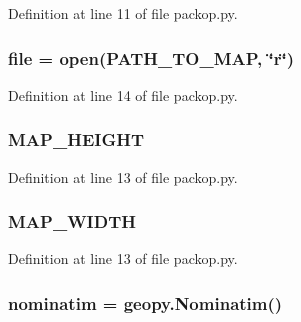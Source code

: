 Definition at line 11 of file packop.\+py.

\subsubsection[{\texorpdfstring{file}{file}}]{\setlength{\rightskip}{0pt plus 5cm}file = open({\bf P\+A\+T\+H\+\_\+\+T\+O\+\_\+\+M\+AP}, \char`\"{}r\char`\"{})}\hypertarget{namespacesrc_1_1packop_a40a5d58ffa6e88aa578d6683ac413105}{}\label{namespacesrc_1_1packop_a40a5d58ffa6e88aa578d6683ac413105}


Definition at line 14 of file packop.\+py.

\subsubsection[{\texorpdfstring{M\+A\+P\+\_\+\+H\+E\+I\+G\+HT}{MAP_HEIGHT}}]{\setlength{\rightskip}{0pt plus 5cm}M\+A\+P\+\_\+\+H\+E\+I\+G\+HT}\hypertarget{namespacesrc_1_1packop_a66c886303dc7450a2538d2d0799d98e3}{}\label{namespacesrc_1_1packop_a66c886303dc7450a2538d2d0799d98e3}


Definition at line 13 of file packop.\+py.

\subsubsection[{\texorpdfstring{M\+A\+P\+\_\+\+W\+I\+D\+TH}{MAP_WIDTH}}]{\setlength{\rightskip}{0pt plus 5cm}M\+A\+P\+\_\+\+W\+I\+D\+TH}\hypertarget{namespacesrc_1_1packop_ad9405b9e27addc61f310c18d8f5f85e1}{}\label{namespacesrc_1_1packop_ad9405b9e27addc61f310c18d8f5f85e1}


Definition at line 13 of file packop.\+py.

\subsubsection[{\texorpdfstring{nominatim}{nominatim}}]{\setlength{\rightskip}{0pt plus 5cm}nominatim = geopy.\+Nominatim()}\hypertarget{namespacesrc_1_1packop_adb3f5c1dc784a036515907f2303d1fdc}{}\label{namespacesrc_1_1packop_adb3f5c1dc784a036515907f2303d1fdc}


